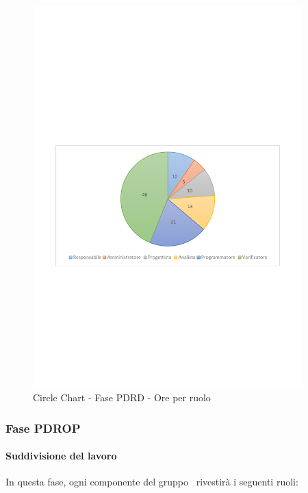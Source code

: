 \documentclass[../PianoProgetto.tex]{subfiles}
\begin{document}
		\begin{figure}[!h]
		\centering
		\includegraphics[width=0.93\textwidth , trim=2cm 9.5cm 2cm 11cm]{grafici/PDRD/PDRD-ore-ruolo}
			\caption{Circle Chart - Fase PDRD - Ore per ruolo}
		\label{fig:CircleChart-fasePDRD_ore_r}
	\end{figure}
	
\vfill
	
	\subsubsection{Fase PDROP}
				\paragraph{Suddivisione del lavoro}
					In questa fase, ogni componente del gruppo \leaf\ rivestirà i seguenti ruoli:
	
\end{document}
